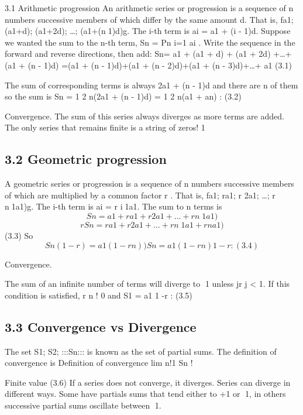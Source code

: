 
3.1 Arithmetic progression
An arithmetic series or progression is a sequence of n numbers successive members of
which differ by the same amount d. That is, fa1; (a1+d); (a1+2d); \ldots ; (a1+(n􀀀1)d)g.
The i-th term is ai = a1 + (i - 1)d.
Suppose we wanted the sum to the n-th term, Sn =
Pn
i=1 ai . Write the sequence in
the forward and reverse directions, then add:
Sn= a1 + (a1 + d) + (a1 + 2d) +\ldots+(a1 + (n -  1)d)
=(a1 + (n -  1)d)+(a1 + (n -  2)d)+(a1 + (n -  3)d)+\ldots+ a1
(3.1)

The sum of corresponding terms is always 2a1 + (n -  1)d and there are n of them so
the sum is
Sn =
1
2
n(2a1 + (n -  1)d) =
1
2
n(a1 + an) : (3.2)


Convergence.
 The sum of this series always diverges as more terms are added. The
only series that remains finite is a string of zeros!
1

\subsection*{3.2 Geometric progression}
A geometric series or progression is a sequence of n numbers successive members of
which are multiplied by a common factor r . That is, fa1; ra1; r 2a1; \ldots ; r n􀀀1a1)g. The
i-th term is ai = r i􀀀1a1. The sum to n terms is
\[Sn = a1 + ra1 + r 2a1 + \ldots + r n􀀀1a1)\]
\[rSn = ra1 + r 2a1 + \ldots + r n􀀀1a1 + r na1)\]
(3.3)
So
\[ Sn(1  -r ) = a1(1  -r n) )Sn =
a1(1  -r n)
1  -r
: (3.4)\]

Convergence. 

The sum of an infinite number of terms will diverge to 1 unless
jr j < 1. If this condition is satisfied, r n ! 0 and
S1 =
a1
1  -r
: (3.5)

\subsection*{3.3 Convergence vs Divergence}
The set S1; S2; :::Sn::: is known as the set of partial sums. The definition of convergence
is
Definition of convergence
lim
n!1
Sn ! 


Finite value (3.6)
If a series does not converge, it diverges. Series can diverge in different ways. Some
have partials sums that tend either to +1 or 􀀀1, in others successive partial sums
oscillate between 1.

